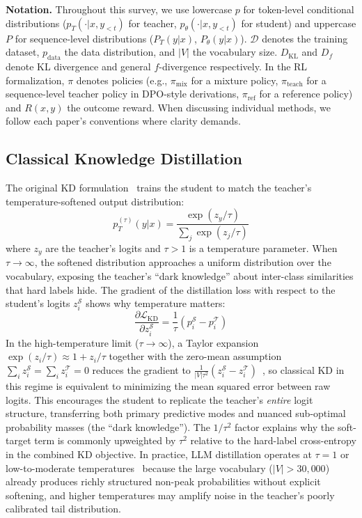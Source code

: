 \documentclass{article} %
\newcommand{\KL}{D_{\mathrm{KL}}}
\newcommand{\ptheta}{p_\theta}
\newcommand{\pteacher}{p_T}
\newcommand{\pdata}{p_{\mathrm{data}}}
\newcommand{\loss}{\mathcal{L}}
\begin{document}
\textbf{Notation.} Throughout this survey, we use lowercase $p$ for token-level conditional distributions ($\pteacher(\cdot|x, y_{<t})$ for teacher, $\ptheta(\cdot|x, y_{<t})$ for student) and uppercase $P$ for sequence-level distributions ($P_T(y|x)$, $P_\theta(y|x)$). $\mathcal{D}$ denotes the training dataset, $\pdata$ the data distribution, and $|V|$ the vocabulary size. $\KL$ and $D_f$ denote KL divergence and general $f$-divergence respectively. In the RL formalization, $\pi$ denotes policies (e.g., $\pi_{\mathrm{mix}}$ for a mixture policy, $\pi_{\text{teach}}$ for a sequence-level teacher policy in DPO-style derivations, $\pi_{\text{ref}}$ for a reference policy) and $R(x,y)$ the outcome reward. When discussing individual methods, we follow each paper's conventions where clarity demands.

\subsection{Classical Knowledge Distillation}

The original KD formulation~\citep{1503.02531} trains the student to match the teacher's temperature-softened output distribution:
\begin{equation}
    p_T^{(\tau)}(y|x) = \frac{\exp(z_y / \tau)}{\sum_{j} \exp(z_j / \tau)}
\end{equation}
where $z_y$ are the teacher's logits and $\tau > 1$ is a temperature parameter. When $\tau \to \infty$, the softened distribution approaches a uniform distribution over the vocabulary, exposing the teacher's ``dark knowledge'' about inter-class similarities that hard labels hide. The gradient of the distillation loss with respect to the student's logits $z_i^{\mathcal{S}}$ shows why temperature matters:
\begin{equation}
    \frac{\partial \loss_{\text{KD}}}{\partial z_i^{\mathcal{S}}} = \frac{1}{\tau}(p_i^{\mathcal{S}} - p_i^{\mathcal{T}})
\end{equation}
In the high-temperature limit ($\tau \to \infty$), a Taylor expansion $\exp(z_i/\tau) \approx 1 + z_i/\tau$ together with the zero-mean assumption $\sum_i z_i^{\mathcal{S}} = \sum_i z_i^{\mathcal{T}} = 0$ reduces the gradient to $\frac{1}{|V|\tau^2}(z_i^{\mathcal{S}} - z_i^{\mathcal{T}})$~\citep{1503.02531}, so classical KD in this regime is equivalent to minimizing the mean squared error between raw logits. This encourages the student to replicate the teacher's \emph{entire} logit structure, transferring both primary predictive modes and nuanced sub-optimal probability masses (the ``dark knowledge''). The $1/\tau^2$ factor explains why the soft-target term is commonly upweighted by $\tau^2$ relative to the hard-label cross-entropy in the combined KD objective. In practice, LLM distillation operates at $\tau = 1$ or low-to-moderate temperatures~\citep{2402.11890} because the large vocabulary ($|V| > 30{,}000$) already produces richly structured non-peak probabilities without explicit softening, and higher temperatures may amplify noise in the teacher's poorly calibrated tail distribution.
\end{document}
